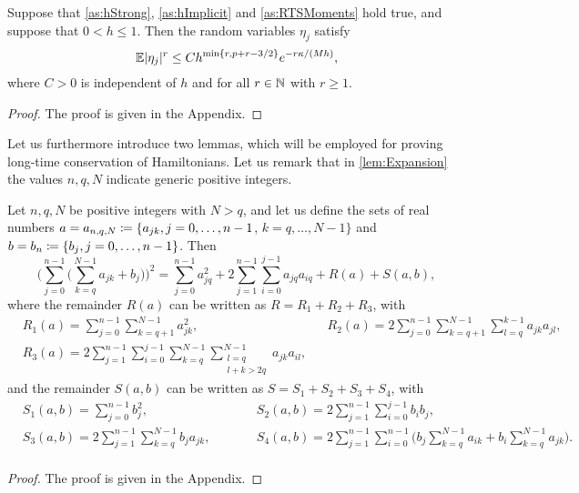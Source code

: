 \documentclass[10pt]{article}
\begin{document}
\begin{lemma}\label{lem:BoundEtaJ} {Suppose that \cref{as:hStrong}, \cref{as:hImplicit} and \cref{as:RTSMoments} hold true, and suppose that $0 < h \leq 1$. Then} the random variables $\eta_j$ satisfy
	\begin{equation}
	\operatorname{\mathbb{E}} \lvert\eta_j\rvert^r \leq C h^{\min\{r, p+r-3/2\}} e^{-r\kappa/(Mh)}, 
	\end{equation}
	where $C > 0$ is independent of $h$ and for all $r \in \mathbb{N}$ with $r \geq 1$.
\end{lemma}
\begin{proof} The proof is given in the Appendix. \end{proof}
Let us furthermore introduce two lemmas, which will be employed for proving long-time conservation of Hamiltonians. {Let us remark that in \cref{lem:Expansion} the values $n, q, N$ indicate generic positive integers.}   
\begin{lemma}\label{lem:Expansion}  Let $n, q, N$ be positive integers with $N > q$, and let us define the sets of real numbers $a = a_{n,q,N} \coloneqq \{a_{jk}, j = 0, \ldots, n-1$, $k = q, \ldots, N-1\}$ and $b = b_n \coloneqq \{b_j, j = 0, \ldots, n-1\}$. Then
	\begin{equation}
	\Big(\sum_{j=0}^{n-1} \Big(\sum_{k=q}^{N-1} a_{jk} + b_j\Big)\Big)^2 = \sum_{j=0}^{n-1} a_{jq}^2 + 2 \sum_{j=1}^{n-1} \sum_{i=0}^{j-1} a_{jq}a_{iq} + R(a) + S(a, b),
	\end{equation}
	where the remainder $R(a)$ can be written as $R = R_1 + R_2 + R_3$, with
	\begin{equation}
	\begin{alignedat}{2}
		&R_1(a) = \sum_{j=0}^{n-1}\sum_{k=q+1}^{N-1} a_{jk}^2,	&&R_2(a) = 2 \sum_{j=0}^{n-1}\sum_{k=q+1}^{N-1}\sum_{l=q}^{k-1} a_{jk} a_{jl},\\
		&R_3(a) = 2 \sum_{j=1}^{n-1} \sum_{i=0}^{j-1} \sum_{k=q}^{N-1}\sum_{\substack{l=q \\ l+k > 2q}}^{N-1} a_{jk}a_{il},
	\end{alignedat}
	\end{equation}
	and the remainder $S(a, b)$ can be written as $S = S_1 + S_2 + S_3 + S_4$, with
	\begin{equation}
	\begin{alignedat}{2}
		&S_1(a, b) = \sum_{j=0}^{n-1} b_j^2,  &&S_2(a, b) = 2\sum_{j=1}^{n-1} \sum_{i=0}^{j-1} b_i b_j, \\
		&S_3(a, b) = 2\sum_{j=1}^{n-1} \sum_{k=q}^{N-1} b_j a_{jk}, \qquad &&S_4(a, b) = 2\sum_{j=1}^{n-1}\sum_{i=0}^{n-1}\Big(b_j \sum_{k=q}^{N-1} a_{ik} + b_i \sum_{k=q}^{N-1} a_{jk}\Big).\\
	\end{alignedat}
	\end{equation}
\end{lemma}
\begin{proof} The proof is given in the Appendix. \end{proof}
\end{document}
